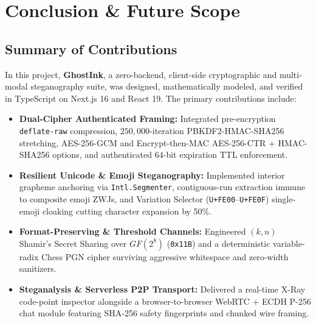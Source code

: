 \documentclass[12pt,a4paper,oneside,openany]{report}
\begin{document}
\chapter{Conclusion \& Future Scope}

\section{Summary of Contributions}
In this project, \textbf{GhostInk}, a zero-backend, client-side cryptographic and multi-modal steganography suite, was designed, mathematically modeled, and verified in TypeScript on Next.js 16 and React 19. The primary contributions include:
\begin{itemize}
    \item \textbf{Dual-Cipher Authenticated Framing:} Integrated pre-encryption \texttt{deflate-raw} compression, $250{,}000$-iteration PBKDF2-HMAC-SHA256 stretching, AES-256-GCM and Encrypt-then-MAC AES-256-CTR + HMAC-SHA256 options, and authenticated $64$-bit expiration TTL enforcement.
    \item \textbf{Resilient Unicode \& Emoji Steganography:} Implemented interior grapheme anchoring via \texttt{Intl.Segmenter}, contiguous-run extraction immune to composite emoji ZWJs, and Variation Selector (\texttt{U+FE00}--\texttt{U+FE0F}) single-emoji cloaking cutting character expansion by 50\%.
    \item \textbf{Format-Preserving \& Threshold Channels:} Engineered $(k, n)$ Shamir's Secret Sharing over $GF(2^8)$ (\texttt{0x11B}) and a deterministic variable-radix Chess PGN cipher surviving aggressive whitespace and zero-width sanitizers.
    \item \textbf{Steganalysis \& Serverless P2P Transport:} Delivered a real-time X-Ray code-point inspector alongside a browser-to-browser WebRTC + ECDH P-256 chat module featuring SHA-256 safety fingerprints and chunked wire framing.
\end{itemize}
\end{document}
